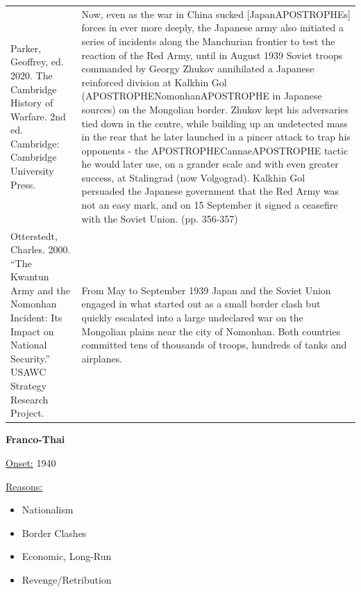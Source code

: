 {\begin{longtable}{p{}p{}}
Parker, Geoffrey, ed. 2020. The Cambridge History of Warfare. 2nd ed. Cambridge: Cambridge University Press. & Now, even as the war in China sucked [JapanAPOSTROPHEs] forces in ever more deeply, the Japanese army also initiated a series of incidents along the Manchurian frontier to test the reaction of the Red Army, until in August 1939 Soviet troops commanded by Georgy Zhukov annihilated a Japanese reinforced division at Kalkhin Gol (APOSTROPHENomonhanAPOSTROPHE in Japanese sources) on the Mongolian border. Zhukov kept his adversaries tied down in the centre, while building up an undetected mass in the rear that he later launched in a pincer attack to trap his opponents - the APOSTROPHECannaeAPOSTROPHE tactic he would later use, on a grander scale and with even greater success, at Stalingrad (now Volgograd). Kalkhin Gol persuaded the Japanese government that the Red Army was not an easy mark, and on 15 September it signed a ceasefire with the Soviet Union. (pp. 356-357)
\\
Otterstedt, Charles. 2000. “The Kwantun Army and the Nomonhan Incident: Its Impact on National Security.” USAWC Strategy Research Project. & From May to September 1939 Japan and the Soviet Union engaged in what started out as a small border clash but quickly escalated into a large undeclared war on the Mongolian plains near the city of Nomonhan. Both countries committed tens of thousands of troops, hundreds of tanks and airplanes. 
\\
\end{longtable}}
\clearpage
         \textbf{Franco-Thai} 

          \underline{Onset:} 1940         

\underline{Reasons:}
\begin{itemize}
\item Nationalism
\item Border Clashes
\item Economic, Long-Run
\item Revenge/Retribution
\end{itemize}

